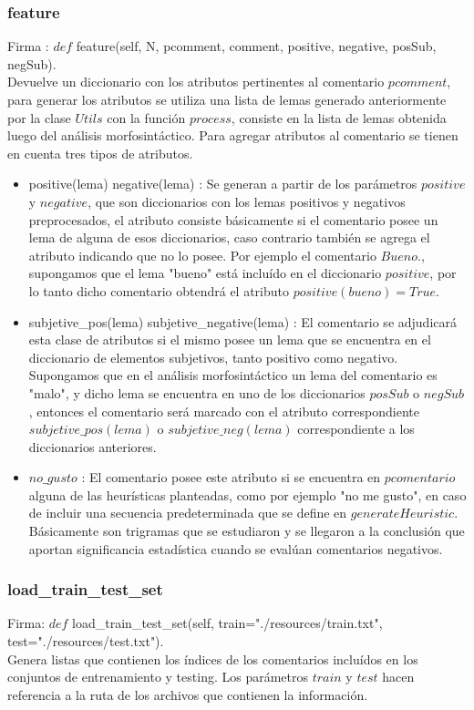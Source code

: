 \documentclass[12pt]{article}
\begin{document}
\subsubsection{feature}
Firma : $def$ feature(self, N, pcomment, comment, positive, negative, posSub, negSub). \\
Devuelve un diccionario con los atributos pertinentes al comentario $pcomment$, para generar los atributos se utiliza una lista de lemas generado anteriormente por la clase $Utils$ con la función $process$, consiste en la lista de lemas obtenida luego del análisis morfosintáctico. Para agregar atributos al comentario se tienen en cuenta tres tipos de atributos.
\begin{itemize}
  \item positive(lema) negative(lema) : Se generan a partir de los parámetros $positive$ y $negative$, que son diccionarios con los lemas positivos y negativos preprocesados, el atributo consiste básicamente si el comentario posee un lema de alguna de esos diccionarios, caso contrario también se agrega el atributo indicando que no lo posee. Por ejemplo el comentario $Bueno.$, supongamos que el lema "bueno" está incluído en el diccionario $positive$, por lo tanto dicho comentario obtendrá el atributo $positive(bueno) = True$.
  \item subjetive\_pos(lema) subjetive\_negative(lema) : El comentario se adjudicará esta clase de atributos si el mismo posee un lema que se encuentra en el diccionario de elementos subjetivos, tanto positivo como negativo. Supongamos que en el análisis morfosintáctico un lema del comentario es "malo", y dicho lema se encuentra en uno de los diccionarios $posSub$ o $negSub$, entonces el comentario será marcado con el atributo correspondiente $subjetive\_pos(lema)$ o $subjetive\_neg(lema)$ correspondiente a los diccionarios anteriores.
  \item $no\_gusto$ :  El comentario posee este atributo si se encuentra en $pcomentario$ alguna de las heurísticas planteadas, como por ejemplo "no me gusto", en caso de incluir una secuencia predeterminada que se define en $generateHeuristic$. Básicamente son trigramas que se estudiaron y se llegaron a la conclusión que aportan significancia estadística cuando se evalúan comentarios negativos.
\end{itemize}


\subsubsection{load\_train\_test\_set}
Firma: $def$ load\_train\_test\_set(self, train="./resources/train.txt", test="./resources/test.txt"). \\
Genera listas que contienen los índices de los comentarios incluídos en los conjuntos de entrenamiento y testing. Los parámetros $train$ y $test$ hacen referencia a la ruta de los archivos que contienen la información.
\end{document}
